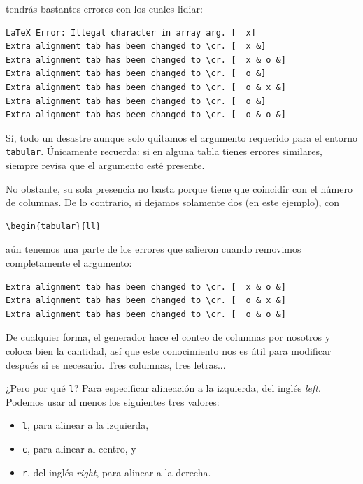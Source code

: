 \noindent tendrás bastantes errores con los cuales lidiar:

\begin{lstlisting}[style=errores]
LaTeX Error: Illegal character in array arg. [	x]
Extra alignment tab has been changed to \cr. [	x &]
Extra alignment tab has been changed to \cr. [	x & o &]
Extra alignment tab has been changed to \cr. [	o &]
Extra alignment tab has been changed to \cr. [	o & x &]
Extra alignment tab has been changed to \cr. [	o &]
Extra alignment tab has been changed to \cr. [	o & o &]
\end{lstlisting}

Sí, todo un desastre aunque solo quitamos el argumento requerido para el entorno \texttt{tabular}. Únicamente recuerda: si en alguna tabla tienes errores similares, siempre revisa que el argumento esté presente.

No obstante, su sola presencia no basta porque tiene que coincidir con el número de columnas. De lo contrario, si dejamos solamente dos (en este ejemplo), con

\begin{lstlisting}[style=latex,numbers=none]
\begin{tabular}{ll}
\end{lstlisting}

\noindent aún tenemos una parte de los errores que salieron cuando removimos completamente el argumento:

\begin{lstlisting}[style=errores]
Extra alignment tab has been changed to \cr. [	x & o &]
Extra alignment tab has been changed to \cr. [	o & x &]
Extra alignment tab has been changed to \cr. [	o & o &]
\end{lstlisting}

De cualquier forma, el generador hace el conteo de columnas por nosotros y coloca bien la cantidad, así que este conocimiento nos es útil para modificar después si es necesario. Tres columnas, tres letras...

¿Pero por qué \texttt{l}? Para especificar alineación a la izquierda, del inglés \emph{left}. Podemos usar al menos los siguientes tres valores:
\begin{itemize}
	\item \texttt{l}, para alinear a la izquierda,
	\item \texttt{c}, para alinear al centro, y
	\item \texttt{r}, del inglés \emph{right}, para alinear a la derecha.
\end{itemize}

